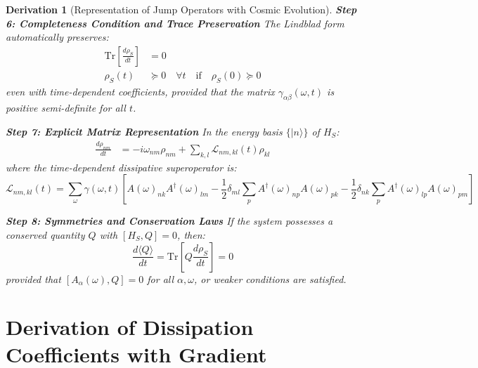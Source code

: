 \documentclass[10pt, a4paper]{article}
\newcommand{\Tr}{\text{Tr}}
\newtheorem{derivation}{Derivation}
\begin{document}
\begin{derivation}[Representation of Jump Operators with Cosmic Evolution]
\textbf{Step 6: Completeness Condition and Trace Preservation}
The Lindblad form automatically preserves:
\begin{align}
\Tr\left[\frac{d\rho_S}{dt}\right] &= 0
\tag{25.8} \\
\rho_S(t) &\succeq 0 \quad \forall t \quad \text{if} \quad \rho_S(0) \succeq 0
\tag{25.9}
\end{align}
even with time-dependent coefficients, provided that the matrix $\gamma_{\alpha\beta}(\omega, t)$ is positive semi-definite for all $t$.

\textbf{Step 7: Explicit Matrix Representation}
In the energy basis $\{|n\rangle\}$ of $H_S$:
\begin{align}
\frac{d\rho_{nm}}{dt} &= -i\omega_{nm}\rho_{nm} + \sum_{k,l} \mathcal{L}_{nm,kl}(t) \rho_{kl}
\tag{25.10}
\end{align}
where the time-dependent dissipative superoperator is:
\begin{equation}
\mathcal{L}_{nm,kl}(t) = \sum_{\omega} \gamma(\omega, t) \left[ A(\omega)_{nk} A^\dagger(\omega)_{lm} - \frac{1}{2} \delta_{ml} \sum_p A^\dagger(\omega)_{np} A(\omega)_{pk} - \frac{1}{2} \delta_{nk} \sum_p A^\dagger(\omega)_{lp} A(\omega)_{pm} \right]
\tag{25.11}
\end{equation}

\textbf{Step 8: Symmetries and Conservation Laws}
If the system possesses a conserved quantity $Q$ with $[H_S, Q] = 0$, then:
\begin{equation}
\frac{d\langle Q \rangle}{dt} = \Tr\left[Q \frac{d\rho_S}{dt}\right] = 0
\tag{25.12}
\end{equation}
provided that $[A_\alpha(\omega), Q] = 0$ for all $\alpha, \omega$, or weaker conditions are satisfied.
\end{derivation}

\section{Derivation of Dissipation Coefficients with Gradient}
\end{document}
